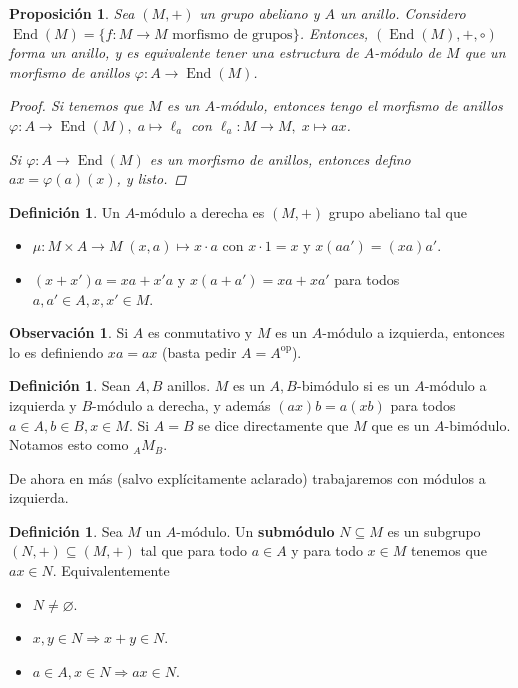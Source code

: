 \documentclass[12pt]{book}
\newtheorem{prop}[teo]{Proposición}
\theoremstyle{definition}
\newtheorem{obs}[teo]{Observación}
\newtheorem{defn}[teo]{Definición}
\let\emptyset\varnothing
\DeclareMathOperator{\End}{End}
\begin{document}
\begin{prop}
Sea $(M,+)$ un grupo abeliano y $A$ un anillo. Considero $\End(M)=\{f:M\to M \text{ morfismo de grupos}\}$. Entonces, $(\End(M),+,\circ)$ forma un anillo, y es equivalente tener una estructura de $A$-módulo de $M$ que un morfismo de anillos $\varphi : A\to\End(M)$.
\begin{proof}
Si tenemos que $M$ es un $A$-módulo, entonces tengo el morfismo de anillos $\varphi:A\to\End(M), \; a\mapsto \ell_a$ con $\ell_a:M\to M, \; x\mapsto ax$.

Si $\varphi:A\to \End(M)$ es un morfismo de anillos, entonces defino $ax = \varphi(a)(x)$, y listo.
\end{proof}
\end{prop}

\begin{defn}
Un $A$-módulo a derecha es $(M,+)$ grupo abeliano tal que \begin{itemize} \item $ \mu:M\times A\to M \; (x,a)\mapsto x\cdot a$ con $x\cdot 1 = x$ y $x(aa')=(xa)a'$. \item $(x+x')a=xa+x'a$ y $x(a+a')=xa+xa'$ para todos $a,a'\in A, x,x'\in M$. \end{itemize}
\end{defn}

\begin{obs}
Si $A$ es conmutativo y $M$ es un $A$-módulo a izquierda, entonces lo es definiendo $xa=ax$ (basta pedir $A=A^{\mathrm{op}}$).
\end{obs}

\begin{defn}
Sean $A,B$ anillos. $M$ es un $A,B$-bimódulo si es un $A$-módulo a izquierda y $B$-módulo a derecha, y además $(ax)b=a(xb)$ para todos $a\in A, b\in B, x\in M$. Si $A=B$ se dice directamente que $M$ que es un $A$-bimódulo. Notamos esto como $_AM_B$.
\end{defn}

De ahora en más (salvo explícitamente aclarado) trabajaremos con módulos a izquierda.

\begin{defn}
Sea $M$ un $A$-módulo. Un \textbf{submódulo} $N\subseteq M$ es un subgrupo $(N,+)\subseteq (M,+)$ tal que para todo $a\in A$ y para todo $x\in M$ tenemos que $ax\in N$. Equivalentemente \begin{itemize} \item $N\neq \emptyset$. \item $x,y\in N \Longrightarrow x+y\in N$. \item $a\in A,x\in N \Longrightarrow ax\in N$. \end{itemize}
\end{defn}
\end{document}
